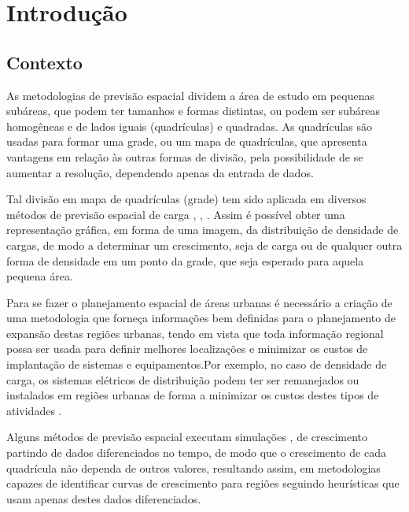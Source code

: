 \chapter{Introdução}
\label{introducao}

\section{Contexto}

As metodologias de previsão espacial dividem a área de estudo em pequenas subáreas, que podem ter tamanhos e formas distintas, ou podem ser subáreas homogêneas e de lados iguais (quadrículas) e quadradas. As quadrículas são usadas para formar uma grade, ou um mapa de quadrículas, que  apresenta vantagens em relação às outras formas de divisão, pela possibilidade de se aumentar a resolução, dependendo apenas da entrada de dados.

Tal  divisão em mapa de quadrículas (grade) tem sido aplicada em diversos métodos de previsão espacial de carga \cite{willis2002spatial}, \cite{melo2012multi}, \cite{arango2004spatial}. Assim é possível obter uma representação gráfica, em forma de uma imagem, da distribuição de densidade de cargas, de modo a determinar um crescimento, seja de carga ou de qualquer outra forma de densidade em um ponto da grade, que seja esperado para aquela pequena área. 

Para se fazer o planejamento espacial de áreas urbanas é necessário a criação de uma metodologia que forneça informações bem definidas para o planejamento de expansão destas regiões urbanas, tendo em vista que toda informação regional possa ser usada para definir melhores localizações e minimizar os custos de implantação de sistemas e equipamentos.Por exemplo, no caso de densidade de carga, os sistemas elétricos de distribuição podem ter ser remanejados ou instalados em regiões urbanas de forma a minimizar os custos destes tipos de atividades \cite{willis2007spatial}.    

Alguns métodos de previsão espacial executam simulações \cite{arango2004spatial}, \cite{carreno2011cellular} de crescimento partindo de dados diferenciados no tempo, de modo que o crescimento de cada quadrícula não dependa de outros valores, resultando assim, em metodologias capazes de identificar curvas de crescimento para regiões seguindo heurísticas que usam apenas destes dados diferenciados. 

